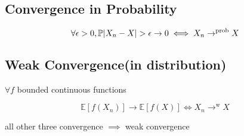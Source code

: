 \subsection{Convergence in Probability}

$$
\forall \epsilon>0, \prob{|X_n-X|>\epsilon}\rightarrow0\iff X_n\rightarrow^{\text{prob}}X
$$

\subsection{Weak Convergence(in distribution)}

$\forall f $ bounded continuous functions

$$
\mathbb{E}[f(X_n)]\rightarrow\mathbb{E}[f(X)]\iff X_n\rightarrow^{\text{w}}X
$$

all other three convergence $\implies$ weak convergence


